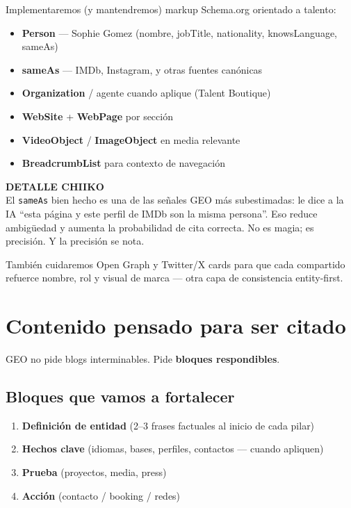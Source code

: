 \documentclass[11pt,a4paper]{article}
\newcommand{\callout}[2]{%
  \par\noindent
  \colorbox{soft}{%
    \begin{minipage}{\dimexpr\textwidth-1.1cm\relax}
      \vspace{0.45em}
      {\sffamily\bfseries\footnotesize\color{mute}#1}\\[0.4em]
      {\color{ink}#2}
      \vspace{0.45em}
    \end{minipage}%
  }%
  \par\vspace{0.85em}
}
\begin{document}
Implementaremos (y mantendremos) markup Schema.org orientado a talento:

\begin{itemize}
  \item \textbf{Person} --- Sophie Gomez (nombre, jobTitle, nationality, knowsLanguage, sameAs)
  \item \textbf{sameAs} --- IMDb, Instagram, y otras fuentes canónicas
  \item \textbf{Organization} / agente cuando aplique (Talent Boutique)
  \item \textbf{WebSite} + \textbf{WebPage} por sección
  \item \textbf{VideoObject} / \textbf{ImageObject} en media relevante
  \item \textbf{BreadcrumbList} para contexto de navegación
\end{itemize}

\callout{DETALLE CHIIKO}{%
El \texttt{sameAs} bien hecho es una de las señales GEO más subestimadas:
le dice a la IA ``esta página y este perfil de IMDb son la misma persona''.
Eso reduce ambigüedad y aumenta la probabilidad de cita correcta.
No es magia; es precisión. Y la precisión se nota.
}

También cuidaremos Open Graph y Twitter/X cards para que cada compartido
refuerce nombre, rol y visual de marca --- otra capa de consistencia entity-first.

\section{Contenido pensado para ser citado}

GEO no pide blogs interminables. Pide \textbf{bloques respondibles}.

\subsection{Bloques que vamos a fortalecer}
\begin{enumerate}
  \item \textbf{Definición de entidad} (2--3 frases factuales al inicio de cada pilar)
  \item \textbf{Hechos clave} (idiomas, bases, perfiles, contactos --- cuando apliquen)
  \item \textbf{Prueba} (proyectos, media, press)
  \item \textbf{Acción} (contacto / booking / redes)
\end{enumerate}
\end{document}
